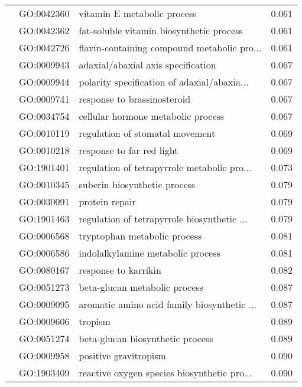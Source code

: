 \begin{longtable}{lllr}
   & GO:0042360 &                  vitamin E metabolic process &         0.061 \\
   & GO:0042362 &     fat-soluble vitamin biosynthetic process &         0.061 \\
   & GO:0042726 &  flavin-containing compound metabolic pro... &         0.061 \\
   & GO:0009943 &           adaxial/abaxial axis specification &         0.067 \\
   & GO:0009944 &  polarity specification of adaxial/abaxia... &         0.067 \\
   & GO:0009741 &                  response to brassinosteroid &         0.067 \\
   & GO:0034754 &           cellular hormone metabolic process &         0.067 \\
   & GO:0010119 &              regulation of stomatal movement &         0.069 \\
   & GO:0010218 &                    response to far red light &         0.069 \\
   & GO:1901401 &  regulation of tetrapyrrole metabolic pro... &         0.073 \\
   & GO:0010345 &                 suberin biosynthetic process &         0.079 \\
   & GO:0030091 &                               protein repair &         0.079 \\
   & GO:1901463 &  regulation of tetrapyrrole biosynthetic ... &         0.079 \\
   & GO:0006568 &                 tryptophan metabolic process &         0.081 \\
   & GO:0006586 &            indolalkylamine metabolic process &         0.081 \\
   & GO:0080167 &                         response to karrikin &         0.082 \\
   & GO:0051273 &                beta-glucan metabolic process &         0.087 \\
   & GO:0009095 &  aromatic amino acid family biosynthetic ... &         0.087 \\
   & GO:0009606 &                                      tropism &         0.089 \\
   & GO:0051274 &             beta-glucan biosynthetic process &         0.089 \\
   & GO:0009958 &                        positive gravitropism &         0.090 \\
   & GO:1903409 &  reactive oxygen species biosynthetic pro... &         0.090 \\

\end{longtable}
